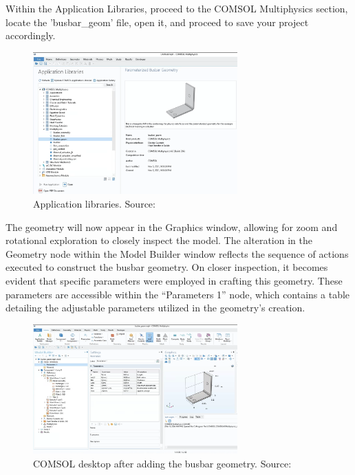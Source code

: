 Within the Application Libraries, proceed to the COMSOL Multiphysics section, locate the 'busbar\_geom' file, open it, and proceed to save your project accordingly.

\begin{figure}[H]
  \centering
  \includegraphics[width=0.7\textwidth]{Chapters/Figures/Chapter 3 Figures/Application Libraries.png}
  \caption{Application libraries. Source: \cite{multiphysics__modeling_nodate}}
  \label{fig:Application libraries}
\end{figure}

The geometry will now appear in the Graphics window, allowing for zoom and rotational exploration to closely inspect the model. The alteration in the Geometry node within the Model Builder window reflects the sequence of actions executed to construct the busbar geometry. On closer inspection, it becomes evident that specific parameters were employed in crafting this geometry. These parameters are accessible within the ``Parameters 1'' node, which contains a table detailing the adjustable parameters utilized in the geometry's creation.

\begin{figure}[H]
  \centering
  \includegraphics[width=0.7\textwidth]{Chapters/Figures/Chapter 3 Figures/Initial Busbar Geom.png}
  \caption{COMSOL desktop after adding the busbar geometry. Source: \cite{multiphysics__modeling_nodate}}
  \label{fig:COMSOL desktop after busbar geometry}
\end{figure}

